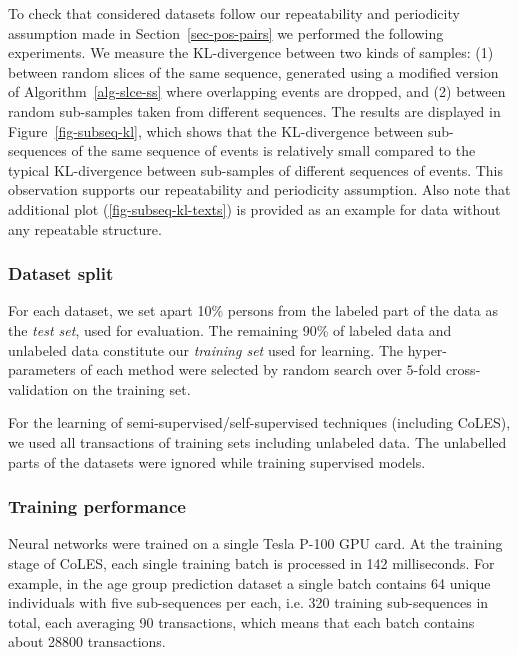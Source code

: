 \documentclass[sigconf]{acmart}
\begin{document}
To check that considered datasets follow our repeatability and periodicity assumption
made in Section~\ref{sec-pos-pairs}
we performed the following experiments. We measure the KL-divergence between two kinds
of samples:
(1) between random slices of the same sequence, generated using a modified version of
Algorithm~\ref{alg-slce-ss} where overlapping events are dropped, and
(2) between random sub-samples taken from different sequences. The results are displayed in
Figure~\ref{fig-subseq-kl}, which shows that the KL-divergence between sub-sequences of
the same sequence of events is relatively small compared to the typical KL-divergence between
sub-samples of different sequences of events. This observation supports our repeatability
and periodicity assumption.
Also note that additional plot (\ref{fig-subseq-kl-texts}) is provided as an example for
data without any repeatable structure.

\subsubsection{Dataset split}

For each dataset, we set apart 10\% persons from the labeled part of the data as
the \emph{test set}, used for evaluation. The remaining 90\% of labeled data and
unlabeled data constitute our \emph{training set} used for learning. The hyper-parameters
of each method were selected by random search over $5$-fold cross-validation on
the training set.

For the learning of semi-supervised/self-supervised techniques (including CoLES),
we used all transactions of training sets including unlabeled data. The unlabelled
parts of the datasets were ignored while training supervised models.

\subsubsection{Training performance}

Neural networks were trained on a single Tesla P-100 GPU card. At the training
stage of CoLES, each single training batch is processed in 142 milliseconds. For example,
in the age group prediction dataset a single batch contains 64 unique individuals with
five sub-sequences per each, i.e. 320 training sub-sequences in total, each averaging
90 transactions, which means that each batch contains about 28800 transactions.
\end{document}
